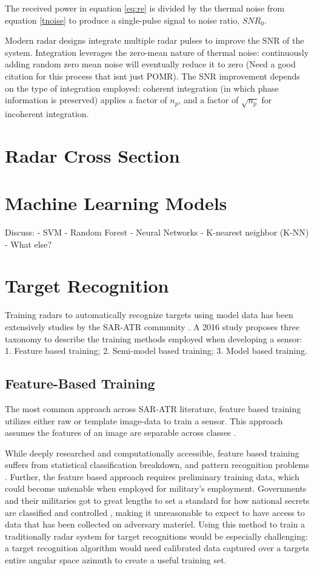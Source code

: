 The received power in equation \ref{eq:re} is divided by the thermal noise from equation \ref{tnoise} to produce a single-pulse signal to noise ratio, $SNR_0$.

Modern radar designs integrate multiple radar pulses to improve the SNR of the system. Integration leverages the zero-mean nature of thermal noise:  continuously adding random zero mean noise will eventually reduce it to zero (Need a good citation for this process that isnt just POMR). The SNR improvement depends on the type of integration employed:  coherent integration (in which phase information is preserved) applies a factor of $n_p$, and a factor of $\sqrt{n_p}$ for incoherent integration.

\section{Radar Cross Section}

\section{Machine Learning Models}

Discuss:
	- SVM
	- Random Forest
	- Neural Networks
	- K-nearest neighbor (K-NN)
	- What else?

\section{Target Recognition}

Training radars to automatically recognize targets using model data has been extensively studies by the SAR-ATR community \cite{SAR_Survey}. A 2016 study proposes three taxonomy to describe the training methods employed when developing a sensor: 1. Feature based training; 2. Semi-model based training; 3. Model based training.

\subsection{Feature-Based Training}
The most common approach across SAR-ATR literature, feature based training utilizes either raw or template image-data to train a sensor. This approach assumes the features of an image are separable across classes \cite{SAR_Survey}.

While deeply researched and computationally accessible, feature based training suffers from statistical classification breakdown, and pattern recognition problems \cite{SAR_Survey}. Further, the feature based approach requires preliminary training data, which could become untenable when employed for military's employment. Governments and their militaries got to great lengths to set a standard for how national secrets are classified and controlled \cite{EO_10290}\cite{PLA_Class}, making it unreasonable to expect to have access to data that has been collected on adversary materiel. Using this method to train a traditionally radar system for target recognitions would be especially challenging: a target recognition algorithm would need calibrated data captured over a targets entire angular space azimuth to create a useful training set.

